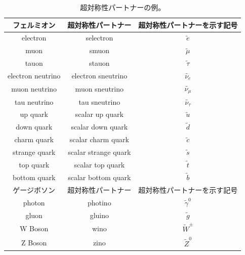 \begin{table}[H]
	\begin{center}
		\begin{tabular}{|ccc|}
		\hline
		フェルミオン&超対称性パートナー&超対称性パートナーを示す記号\\\hline\hline
	        electron&selectron&$\tilde{e}$\\\hline
	        muon&smuon&$\tilde{\mu}$\\\hline
	        tauon&stauon&$\tilde{\tau}$\\\hline
	        electron neutrino&electron sneutrino&$\tilde{\nu_e}$\\\hline
	        muon neutrino&muon sneutrino&$\tilde{\nu_\mu}$\\\hline
	        tau neutrino&tau sneutrino&$\tilde{\nu_\tau}$\\\hline
	        up quark&scalar up quark&$\tilde{u}$\\\hline
	        down quark&scalar down quark&$\tilde{d}$\\\hline
	        charm quark&scalar charm quark&$\tilde{c}$\\\hline
	        strange quark&scalar strange quark&$\tilde{s}$\\\hline
	        top quark&scalar top quark&$\tilde{t}$\\\hline
	        bottom quark&scalar bottom quark&$\tilde{b}$\\\hline
	        \hline
	        ゲージボソン&超対称性パートナー&超対称性パートナーを示す記号\\\hline\hline
	        photon&photino&$\tilde{\gamma}^0$\\\hline
	        gluon&gluino&$\tilde{g}$\\\hline
	        W Boson&wino&$\tilde{W}^\pm$\\\hline
	        Z Boson&zino&$\tilde{Z}^0$\\\hline
	        \hline
		\end{tabular}
	\end{center}
	\caption[超対称性パートナーの例]{超対称性パートナーの例。}
\label{SUSY_particle}
\end{table}

